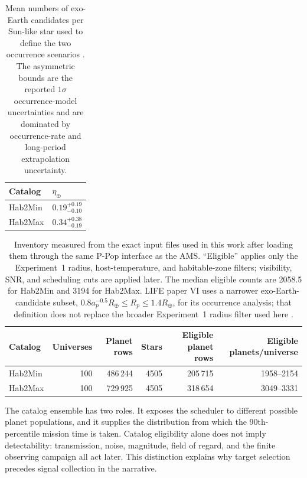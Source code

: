 \documentclass[12pt,a4paper]{article}
\numberwithin{equation}{section}
\numberwithin{figure}{section}
\numberwithin{table}{section}
\begin{document}
\begin{table}[htbp]
\centering
\begin{tabular}{@{}ll@{}}
\toprule
Catalog & $\eta_{\oplus}$ \\
\midrule
Hab2Min & $0.19_{-0.10}^{+0.19}$ \\
Hab2Max & $0.34_{-0.19}^{+0.38}$ \\
\bottomrule
\end{tabular}
\caption{Mean numbers of exo-Earth candidates per Sun-like star used to define the two occurrence scenarios \cite{bryson2021occurrence,kammerer2022life6}. The asymmetric bounds are the reported $1\sigma$ occurrence-model uncertainties and are dominated by occurrence-rate and long-period extrapolation uncertainty.}
\label{tab: eta earth}
\end{table}

\begin{table}[htbp]
\centering
\small
\begin{tabular}{@{}lrrrrr@{}}
\toprule
Catalog & Universes & Planet rows & Stars & Eligible planet rows & Eligible planets/universe \\
\midrule
Hab2Min & 100 & 486\,244 & 4505 & 205\,715 & 1958--2154 \\
Hab2Max & 100 & 729\,925 & 4505 & 318\,654 & 3049--3331 \\
\bottomrule
\end{tabular}
\caption{Inventory measured from the exact input files used in this work after loading them through the same P-Pop interface as the AMS. ``Eligible'' applies only the Experiment~1 radius, host-temperature, and habitable-zone filters; visibility, SNR, and scheduling cuts are applied later. The median eligible counts are 2058.5 for Hab2Min and 3194 for Hab2Max. LIFE paper VI uses a narrower exo-Earth-candidate subset, $0.8a_p^{-0.5}R_\oplus\leq R_p\leq1.4R_\oplus$, for its occurrence analysis; that definition does not replace the broader Experiment~1 radius filter used here \cite{kammerer2022life6}.}
\label{tab: catalog inventory}
\end{table}

The catalog ensemble has two roles. It exposes the scheduler to different possible planet populations, and it supplies the distribution from which the 90th-percentile mission time is taken. Catalog eligibility alone does not imply detectability: transmission, noise, magnitude, field of regard, and the finite observing campaign all act later. This distinction explains why target selection precedes signal collection in the narrative.
\end{document}
